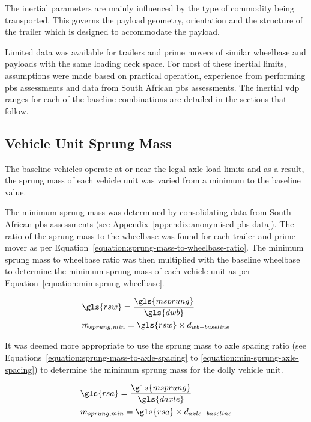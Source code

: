The inertial parameters are mainly influenced by the type of commodity being transported. This governs the payload geometry, orientation and the structure of the trailer which is designed to accommodate the payload.

Limited data was available for trailers and prime movers of similar wheelbase and payloads with the same loading deck space. For most of these inertial limits, assumptions were made based on practical operation, experience from performing \gls{pbs} assessments and data from South African \gls{pbs} assessments. The inertial \gls{vdp} ranges for each of the baseline combinations are detailed in the sections that follow.

\subsection{Vehicle Unit Sprung Mass}\label{section:pr-vehicle-unit-sprung-masses}
The baseline vehicles operate at or near the legal axle load limits and as a result, the sprung mass of each vehicle unit was varied from a minimum to the baseline value.

The minimum sprung mass was determined by consolidating data from South African \gls{pbs} assessments (see Appendix~\ref{appendix:anonymised-pbs-data}). The ratio of the sprung mass to the wheelbase was found for each trailer and prime mover as per Equation~\ref{equation:sprung-mass-to-wheelbase-ratio}. The minimum sprung mass to wheelbase ratio was then multiplied with the baseline wheelbase to determine the minimum sprung mass of each vehicle unit as per Equation~\ref{equation:min-sprung-wheelbase}.

\begin{align}
		\label{equation:sprung-mass-to-wheelbase-ratio}
		&\gls{rsw} = \frac{\gls{msprung}}{\gls{dwb}}\\
		\label{equation:min-sprung-wheelbase}
		&m_{sprung,min} = \gls{rsw} \times d_{wb-baseline}
\end{align}

It was deemed more appropriate to use the sprung mass to axle spacing ratio (see Equations~\ref{equation:sprung-mass-to-axle-spacing} to \ref{equation:min-sprung-axle-spacing}) to determine the minimum sprung mass for the dolly vehicle unit.

\begin{align}
		\label{equation:sprung-mass-to-axle-spacing}
		&\gls{rsa} = \frac{\gls{msprung}}{\gls{daxle}}\\
		\label{equation:min-sprung-axle-spacing}
		&m_{sprung,min} = \gls{rsa} \times d_{axle-baseline}
\end{align}

